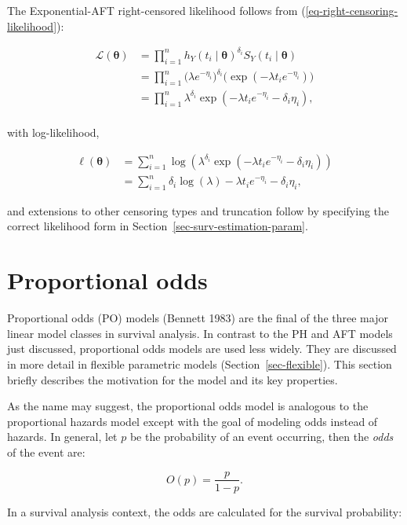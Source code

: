 \documentclass[
  letterpaper,
  krantz2]{style/krantz}
\begin{document}
The Exponential-AFT right-censored likelihood follows from
(\ref{eq-right-censoring-likelihood}):

\[
\begin{aligned}
\mathcal{L}(\boldsymbol{\theta}) &= \prod_{i=1}^n h_Y(t_i \mid \boldsymbol{\theta})^{\delta_i}S_Y(t_i \mid \boldsymbol{\theta}) \\
&= \prod_{i=1}^n \Big(\lambda e^{-\eta_i}\Big)^{\delta_i}\Big(\exp(-\lambda t_i e^{-\eta_i})\Big) \\
&= \prod_{i=1}^n \lambda^{\delta_i} \exp(-\lambda t_i e^{-\eta_i} - \delta_i\eta_i), \\
\end{aligned}
\]

with log-likelihood,

\[
\begin{aligned}
\ell(\boldsymbol{\theta}) &= \sum_{i=1}^n \log(\lambda^{\delta_i} \exp(-\lambda t_i e^{-\eta_i} - \delta_i\eta_i)) \\
&= \sum_{i=1}^n \delta_i\log(\lambda) - \lambda t_i e^{-\eta_i} - \delta_i\eta_i,
\end{aligned}
\]

and extensions to other censoring types and truncation follow by
specifying the correct likelihood form in
Section~\ref{sec-surv-estimation-param}.

\section{Proportional odds}\label{sec-proportionalodds}

Proportional odds (PO) models (Bennett 1983) are the final of the three
major linear model classes in survival analysis.
 In contrast to the PH and AFT models just
discussed, proportional odds models are used less widely. They are
discussed in more detail in flexible parametric models
(Section~\ref{sec-flexible}).  This
section briefly describes the motivation for the model and its key
properties.

As the name may suggest, the proportional odds model is analogous to the
proportional hazards model except with the goal of modeling odds instead
of hazards. In general, let \(p\) be the probability of an event
occurring, then the \emph{odds} of the event are: 

\[
O(p) = \frac{p}{1 - p}.
\]

In a survival analysis context, the odds are calculated for the survival
probability:
\end{document}
